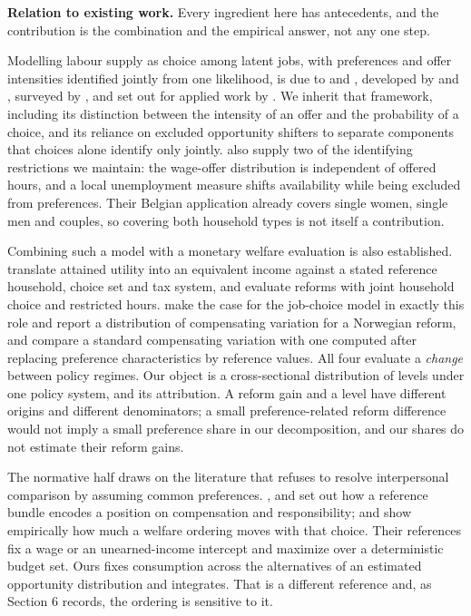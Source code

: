 \textbf{Relation to existing work.} Every ingredient here has antecedents, and the contribution is the combination and the empirical answer, not any one step.

Modelling labour supply as choice among latent jobs, with preferences and offer intensities identified jointly from one likelihood, is due to \citet{aaberge1995} and \citet{aaberge1999}, developed by \citet{dagsvikstrom2006} and \citet{dagsvikjia2016}, surveyed by \citet{aaberge2018}, and set out for applied work by \citet{capeau2016}. We inherit that framework, including its distinction between the intensity of an offer and the probability of a choice, and its reliance on excluded opportunity shifters to separate components that choices alone identify only jointly. \citet{capeau2016} also supply two of the identifying restrictions we maintain: the wage-offer distribution is independent of offered hours, and a local unemployment measure shifts availability while being excluded from preferences. Their Belgian application already covers single women, single men and couples, so covering both household types is not itself a contribution.

Combining such a model with a monetary welfare evaluation is also established. \citet{aaberge1995} translate attained utility into an equivalent income against a stated reference household, choice set and tax system, and \citet{aaberge2004} evaluate reforms with joint household choice and restricted hours. \citet{jiathoresen2021} make the case for the job-choice model in exactly this role and report a distribution of compensating variation for a Norwegian reform, and \citet{jacquet2026} compare a standard compensating variation with one computed after replacing preference characteristics by reference values. All four evaluate a \emph{change} between policy regimes. Our object is a cross-sectional distribution of levels under one policy system, and its attribution. A reform gain and a level have different origins and different denominators; a small preference-related reform difference would not imply a small preference share in our decomposition, and our shares do not estimate their reform gains.

The normative half draws on the literature that refuses to resolve interpersonal comparison by assuming common preferences. \citet{fleurbaeymaniquet2006}, \citet{fleurbaeymaniquet2017} and \citet{fleurbaeymaniquet2018} set out how a reference bundle encodes a position on compensation and responsibility; \citet{decosterhaan2015} and \citet{bargain2013} show empirically how much a welfare ordering moves with that choice. Their references fix a wage or an unearned-income intercept and maximize over a deterministic budget set. Ours fixes consumption across the alternatives of an estimated opportunity distribution and integrates. That is a different reference and, as Section 6 records, the ordering is sensitive to it.

